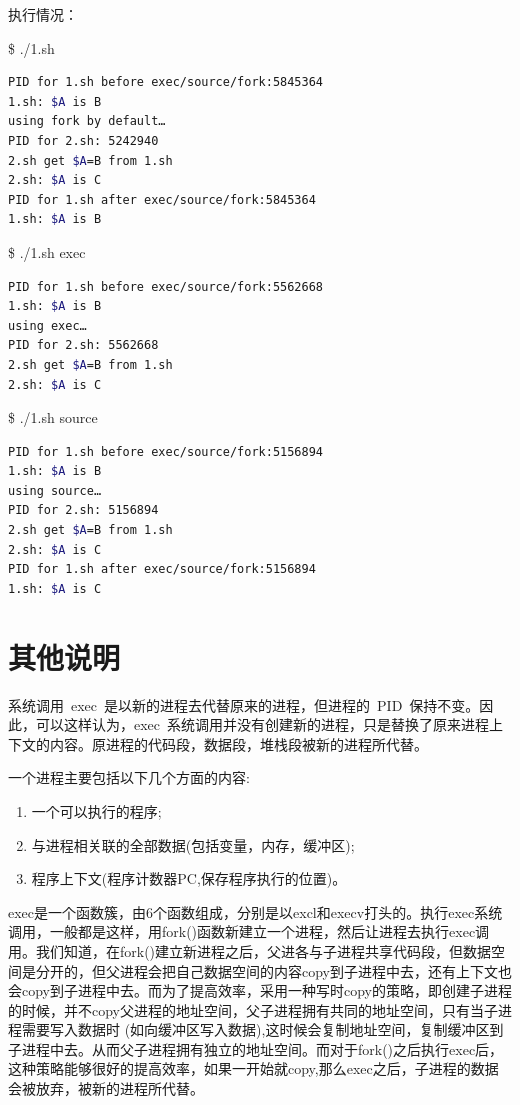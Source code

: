 \documentclass[a4paper]{ctexart}
\begin{document}
执行情况：

\$ ./1.sh
\begin{lstlisting}[language=bash,showstringspaces=false]
PID for 1.sh before exec/source/fork:5845364
1.sh: $A is B
using fork by default…
PID for 2.sh: 5242940
2.sh get $A=B from 1.sh
2.sh: $A is C
PID for 1.sh after exec/source/fork:5845364
1.sh: $A is B
\end{lstlisting}

\$ ./1.sh exec
\begin{lstlisting}[language=bash,showstringspaces=false]
PID for 1.sh before exec/source/fork:5562668
1.sh: $A is B
using exec…
PID for 2.sh: 5562668
2.sh get $A=B from 1.sh
2.sh: $A is C
\end{lstlisting}

\$ ./1.sh source
\begin{lstlisting}[language=bash,showstringspaces=false]
PID for 1.sh before exec/source/fork:5156894
1.sh: $A is B
using source…
PID for 2.sh: 5156894
2.sh get $A=B from 1.sh
2.sh: $A is C
PID for 1.sh after exec/source/fork:5156894
1.sh: $A is C
\end{lstlisting}

\section{其他说明}
系统调用~exec~是以新的进程去代替原来的进程，但进程的~PID~保持不变。因此，可以这样认为，exec~系统调用并没有创建新的进程，只是替换了原来进程上下文的内容。原进程的代码段，数据段，堆栈段被新的进程所代替。

一个进程主要包括以下几个方面的内容:
\begin{enumerate}
\item 一个可以执行的程序;
\item 与进程相关联的全部数据(包括变量，内存，缓冲区);
\item 程序上下文(程序计数器PC,保存程序执行的位置)。
\end{enumerate}

exec是一个函数簇，由6个函数组成，分别是以excl和execv打头的。执行exec系统调用，一般都是这样，用fork()函数新建立一个进程，然后让进程去执行exec调用。我们知道，在fork()建立新进程之后，父进各与子进程共享代码段，但数据空间是分开的，但父进程会把自己数据空间的内容copy到子进程中去，还有上下文也会copy到子进程中去。而为了提高效率，采用一种写时copy的策略，即创建子进程的时候，并不copy父进程的地址空间，父子进程拥有共同的地址空间，只有当子进程需要写入数据时 (如向缓冲区写入数据),这时候会复制地址空间，复制缓冲区到子进程中去。从而父子进程拥有独立的地址空间。而对于fork()之后执行exec后，这种策略能够很好的提高效率，如果一开始就copy,那么exec之后，子进程的数据会被放弃，被新的进程所代替。
\end{document}

